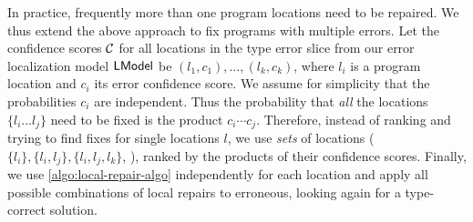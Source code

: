 In practice, frequently more than one program locations need to be repaired. We
thus extend the above approach to fix programs with multiple errors. Let the
confidence scores $\mathcal{C}$ for all locations in the type error slice from our
error localization model $\mathsf{LModel}$ be $(l_1, c_1), \dots, (l_k, c_k)$, where
$l_i$ is a program location and $c_i$ its error confidence score. We assume for
simplicity that the probabilities $c_i$ are independent. Thus the probability
that \emph{all} the locations $\{l_i \dots l_j\}$ need to be fixed is the
product $c_i \cdots c_j$. Therefore, instead of ranking and trying to find
fixes for single locations $l$, we use \emph{sets} of locations ($\{l_i\},
\{l_i, l_j\}, \{l_i, l_j, l_k\}$, \etc), ranked by the products of their
confidence scores. Finally, we use \autoref{algo:local-repair-algo}
independently for each location and apply all possible combinations of local
repairs to erroneous, looking again for a type-correct solution.

\lstDeleteShortInline{|}
